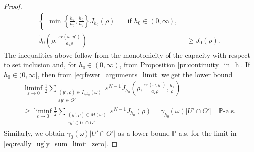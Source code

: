 \documentclass{article}
\numberwithin{equation}{section}
\theoremstyle{definition}
\theoremstyle{remark}
\begin{document}
\begin{proof}
\begin{equation*}
\begin{aligned}
\begin{cases}
                \min \left\{\frac{h_\varepsilon}{h_0}, \frac{h_0}{h_\varepsilon}\right\} J_{h_0}(\rho) \quad &\text{if } h_0 \in (0, \infty),
            \end{cases}
            \\
            \tilde{J}_0\left(\rho, \frac{\varepsilon r(\omega, y')}{a_\varepsilon \rho}\right) &\ge J_0(\rho).
        \end{aligned}
    \end{equation*}
    The inequalities above follow from the monotonicity of the capacity with respect to set inclusion and, for $h_0 \in (0, \infty)$, from Proposition \ref{pr:continuity_in_h}. If $h_0 \in (0, \infty]$, then from \eqref{eq:fewer_arguments_limit} we get the lower bound
    \begin{multline} \label{eq:liminf_bound}
        \liminf_{\varepsilon \to 0} \frac{1}{2} \sum \limits_{\substack{(y', \rho) \in I_{\varepsilon, h_0}(\omega) \\ \varepsilon y' \in O'}} \varepsilon^{N - 1} \tilde{J}_{h_0}\left(\rho, \frac{\varepsilon r(\omega, y')}{a_\varepsilon \rho}, \frac{h_\varepsilon}{\rho}\right) \\
        \ge \liminf_{\varepsilon \to 0} \frac{1}{2} \sum \limits_{\substack{(y', \rho) \in M(\omega) \\ \varepsilon y' \in U' \cap O'}} \varepsilon^{N - 1} J_{h_0}(\rho) = \gamma_{h_0}(\omega) |U' \cap O'| \quad \mathbb{P}\text{-a.s.}
    \end{multline}
    Similarly, we obtain $\gamma_0(\omega)|U' \cap O'|$ as a lower bound $\mathbb{P}$-a.s. for the limit in \eqref{eq:really_ugly_sum_limit_zero}.


\end{proof}
\end{document}
